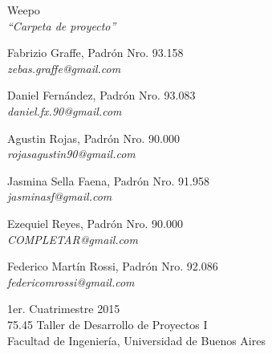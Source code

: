 \documentclass[oneside]{book}
\begin{document}

\thispagestyle{empty}



\begin{titlepage}
	\vspace*{\fill}
	\begin{center}
		\Huge{Weepo} \\
		\medskip
		\huge \textit{``Carpeta de proyecto''} \\
		
		\bigskip\bigskip\bigskip\bigskip\bigskip\bigskip

		\Large Fabrizio Graffe, Padrón Nro. 93.158 \\
		\large \textit{zebas.graffe@gmail.com} \\ \medskip
		
		\Large Daniel Fernández, Padrón Nro. 93.083 \\
		\large \textit{daniel.fx.90@gmail.com} \\ \medskip
		
		\Large Agustin Rojas, Padrón Nro. 90.000 \\
		\large \textit{rojasagustin90@gmail.com} \\ \medskip

		\Large Jasmina Sella Faena, Padrón Nro. 91.958 \\
		\large \textit{jasminasf@gmail.com} \\ \medskip

		\Large Ezequiel Reyes, Padrón Nro. 90.000 \\
		\large \textit{COMPLETAR@gmail.com} \\ \medskip
		
		\Large Federico Martín Rossi, Padrón Nro. 92.086 \\
		\large \textit{federicomrossi@gmail.com} \\

		\bigskip\bigskip\bigskip\bigskip\bigskip\bigskip

		\large 1er. Cuatrimestre 2015 \\ \smallskip
		\large 75.45 Taller de Desarrollo de Proyectos I \\ \smallskip
		\large Facultad de Ingeniería, Universidad de Buenos Aires \\ \smallskip

		\date{}
	\end{center}
	\vspace*{\fill}
\end{titlepage}
\end{document}
